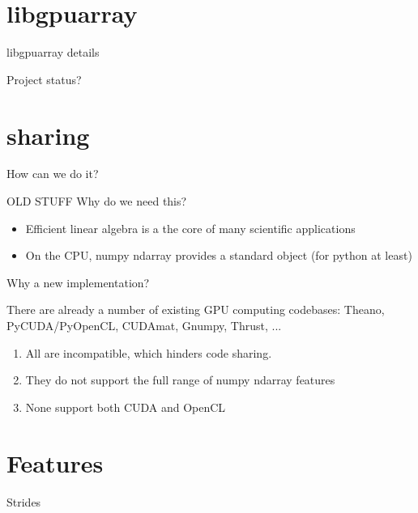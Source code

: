 \documentclass[utf8x,xcolor=pdftex,dvipsnames,table]{beamer}
\begin{document}
\section{libgpuarray}
\begin{frame}{libgpuarray details}
\end{frame}
\begin{frame}{Project status?}
\end{frame}

\section{sharing}
\begin{frame}{How can we do it?}
\end{frame}

\begin{frame}{OLD STUFF Why do we need this?}
\begin{itemize}
\item Efficient linear algebra is a the core of many scientific applications
\item On the CPU, numpy ndarray provides a standard object (for python at least)
\end{itemize}
\end{frame}

\begin{frame}{Why a new implementation?}
\begin{block}{There are already a number of existing GPU computing codebases:}
Theano, PyCUDA/PyOpenCL, CUDAmat, Gnumpy, Thrust, ...
\end {block}
\begin{enumerate}
\item<2-> All are incompatible, which hinders code sharing.
\item<3-> They do not support the full range of numpy ndarray features
\item<4-> None support both CUDA and OpenCL
\end{enumerate}
\end{frame}

\section{Features}

\begin{frame}{Strides}
\begin{center}
\hspace{5em}
\end{center}
\begin{center}
\end{center}
\end{frame}
\end{document}
